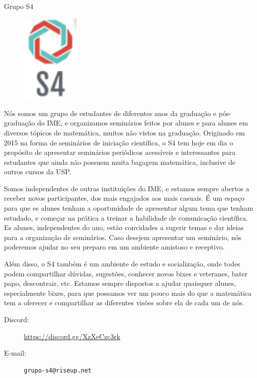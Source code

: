 \begin{subsecao}{Grupo S4}

\begin{figure}
    \vspace{-25pt}
    \begin{center}
      \includegraphics[width=0.25\textwidth]{img/logo S4 maior.png}
    \end{center}
    \vspace{-25pt}
  \end{figure}


Nós somos um grupo de estudantes de diferentes anos da graduação e pós-graduação 
do IME, e organizamos seminários feitos por alunes e para alunes em diversos
tópicos de matemática, muitos não vistos na graduação. Originado em 2015 na forma
de seminários de iniciação científica, o S4 tem hoje em dia o propósito de apresentar seminários 
periódicos acessíveis e interessantes para estudantes que ainda não possuem muita 
bagagem matemática, inclusive de outros cursos da USP. 

Somos independentes de outras instituições do IME, e estamos sempre abertos a 
receber novos participantes, dos mais engajados aos mais casuais. É um espaço
para que es alunes tenham a oportunidade de apresentar algum tema que tenham
estudado, e começar na prática a treinar a habilidade de comunicação científica. 
Es alunes, independentes do ano, estão convidades a sugerir temas e dar ideias
para a organização de seminários. Caso desejem apresentar um seminário, nós
poderemos ajudar no seu preparo em um ambiente amistoso e receptivo.

Além disso, o S4 também é um ambiente de estudo e socialização, onde todes podem
compartilhar dúvidas, sugestões, conhecer novos bixes e veteranes, bater papo,
descontrair, etc. Estamos sempre dispostos a ajudar quaisquer alunes, especialmente
bixes, para que possamos ver um pouco mais do que a matemática tem a oferecer e
compartilhar as diferentes visões sobre ela de cada um de nós.

\begin{description}
  \item[Discord:] \url{https://discord.gg/XzXeCzc3rk}
  \item[E-mail:] {\tt grupo-s4@riseup.net}
\end{description}

\end{subsecao}
